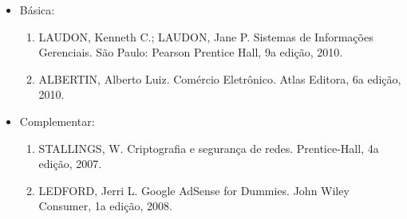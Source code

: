 \begin{itemize}

\item Básica:
    \begin{enumerate}

    \item LAUDON, Kenneth C.; LAUDON, Jane P.
          Sistemas de Informações Gerenciais.
          São Paulo: Pearson Prentice Hall, 9a edição, 2010.

    \item ALBERTIN, Alberto Luiz.
          Comércio Eletrônico.
          Atlas Editora, 6a edição, 2010.

    \end{enumerate}

\item Complementar:
    \begin{enumerate}

    \item STALLINGS, W.
          Criptografia e segurança de redes.
          Prentice-Hall, 4a edição, 2007.

    \item LEDFORD, Jerri L.
          Google AdSense for Dummies.
          John Wiley Consumer, 1a edição, 2008.

    \end{enumerate}

\end{itemize}
